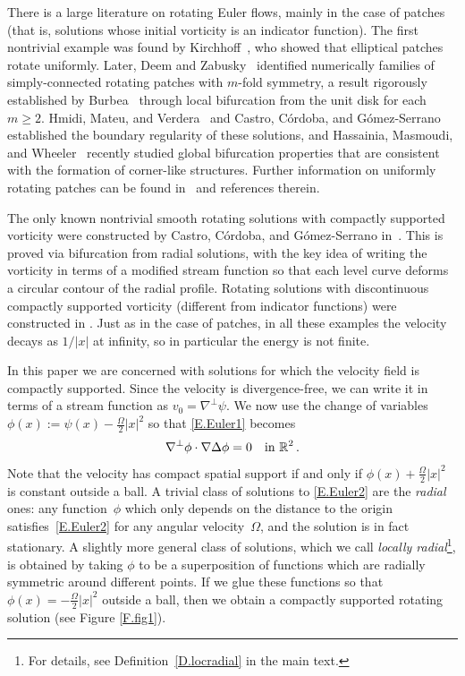 \documentclass[11pt,oneside]{amsart}
\theoremstyle{definition}
\newcommand{\Om}{\Omega}
\def\RR{\mathbb{R}}
\numberwithin{equation}{section}
\begin{document}
There is a large literature on rotating Euler flows, mainly in the case of patches (that is, solutions whose initial vorticity is an indicator function). The first nontrivial example was found by Kirchhoff~\cite{Kirchhoff1876}, who showed that elliptical patches rotate uniformly. Later, Deem and Zabusky~\cite{DeemZabusky1978} identified numerically families of simply-connected rotating patches with $m$-fold symmetry, a result rigorously established by Burbea~\cite{Burbea1982} through local bifurcation from the unit disk for each $m\ge2$. Hmidi, Mateu, and Verdera~\cite{HmidiMateuVerdera2013} and Castro, C\'ordoba, and G\'omez-Serrano~\cite{CastroCordobaGomezSerrano2016} established the boundary regularity of these solutions, and Hassainia, Masmoudi, and Wheeler~\cite{HassainiaMasmoudiWheeler19} recently studied global bifurcation properties that are consistent with the formation of corner-like structures. Further information on uniformly rotating patches can be found in~\cite{HmidiMateu2017, HmidiMateuVerdera2015, Park2022} and references therein. 



The only known nontrivial smooth rotating solutions with compactly supported vorticity were constructed by Castro, C\'ordoba, and G\'omez-Serrano in~\cite{CastroCordobaGomezSerrano2019}. This is proved via bifurcation from radial solutions, with the key idea of writing the vorticity in terms of a modified stream function so that each level curve deforms a circular contour of the radial profile. Rotating solutions with discontinuous compactly supported vorticity (different from indicator functions) were constructed in \cite{GarciaHmidiSoler2020,GarciaHmidiMateu2024}. Just as in the case of patches, in all these examples the velocity decays as $1/|x|$ at infinity, so in particular the energy is not finite. 


In this paper we are concerned with solutions for which the velocity field is compactly supported. Since the velocity is divergence-free, we can write it in terms of a stream function as $v_0=\nabla^\perp\psi$. We now use the change of variables $\phi(x):=\psi(x) - \frac{\Om}{2}|x|^2$ so that \eqref{E.Euler1} becomes
\begin{equation}\label{E.Euler2} 
	\nabla^\perp\phi  \cdot \nabla \Delta\phi =0  \quad \textup{in } \RR^2\,.
\end{equation}
Note that the velocity has compact spatial support if and only if $\phi(x)+\frac\Om2|x|^2$ is constant outside a ball. A trivial class of solutions to \eqref{E.Euler2} are the {\em radial}\/ ones: any function~$\phi$ which only depends on the distance to the origin satisfies~\eqref{E.Euler2} for any angular velocity~$\Omega$, and the solution is in fact stationary. A slightly more general class of solutions, which we call {\em locally radial}\footnote{For details, see Definition~\ref{D.locradial} in the main text.}, is obtained by taking $\phi$ to be a superposition of functions which are radially symmetric around different points. If we glue these functions so that  $\phi(x) = - \frac{\Om}{2} |x|^2$ outside a ball, then we obtain a compactly supported rotating solution (see Figure \ref{F.fig1}). 
\end{document}
